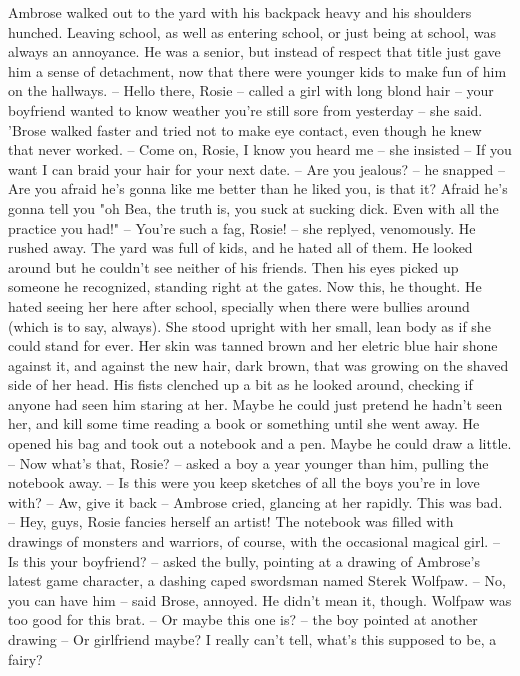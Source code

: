Ambrose walked out to the yard with his backpack heavy and his shoulders hunched.
Leaving school, as well as entering school, or just being at school, was always an annoyance.
He was a senior, but instead of respect that title just gave him a sense of detachment, now that there were younger kids to make fun of him on the hallways.
-- Hello there, Rosie -- called a girl with long blond hair -- your boyfriend wanted to know weather you're still sore from yesterday -- she said.
'Brose walked faster and tried not to make eye contact, even though he knew that never worked.
-- Come on, Rosie, I know you heard me -- she insisted -- If you want I can braid your hair for your next date.
-- Are you jealous? -- he snapped -- Are you afraid he's gonna like me better than he liked you, is that it? Afraid he's gonna tell you "oh Bea, the truth is, you suck at sucking dick. 
Even with all the practice you had!"
-- You're such a fag, Rosie! -- she replyed, venomously. He rushed away.
The yard was full of kids, and he hated all of them. He looked around but he couldn't see neither of his friends. Then his eyes picked up someone he recognized, standing right at the gates.
Now this, he thought. He hated seeing her here after school, specially when there were bullies around (which is to say, always). She stood upright with her small, lean body as if
she could stand for ever. Her skin was tanned brown and her eletric blue hair shone against it, and against the new hair, dark brown, that was growing on the shaved side of her head.
His fists clenched up a bit as he looked around, checking if anyone had seen him staring at her. Maybe he could just pretend he hadn't seen her, 
and kill some time reading a book or something until she went away. He opened his bag and took out a notebook and a pen. Maybe he could draw a little.
-- Now what's that, Rosie? -- asked a boy a year younger than him, pulling the notebook away. -- Is this were you keep sketches of all the boys you're in love with?
-- Aw, give it back -- Ambrose cried, glancing at her rapidly. This was bad.
-- Hey, guys, Rosie fancies herself an artist!
The notebook was filled with drawings of monsters and warriors, of course, with the occasional magical girl.
-- Is this your boyfriend? -- asked the bully, pointing at a drawing of Ambrose's latest game character, a dashing caped swordsman named Sterek Wolfpaw.
-- No, you can have him -- said Brose, annoyed. He didn't mean it, though. Wolfpaw was too good for this brat.
-- Or maybe this one is? -- the boy pointed at another drawing -- Or girlfriend maybe? I really can't tell, what's this supposed to be, a fairy?
